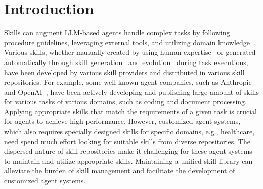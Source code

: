 \documentclass{article}
\theoremstyle{plain}
\theoremstyle{definition}
\theoremstyle{remark}
\begin{document}
\printAffiliationsAndNotice{}  %

\begin{abstract}
  This document provides a basic paper template and submission guidelines.
  Abstracts must be a single paragraph, ideally between 4--6 sentences long.
  Gross violations will trigger corrections at the camera-ready phase.
\end{abstract}

\section{Introduction}
Skills can augment LLM-based agents handle complex tasks by following procedure guidelines,
leveraging external tools, and utilizing domain knowledge~\cite{xxx}. 
Various skills, whether manually created by using human expertise~\cite{xxx} or generated automatically through skill generation~\cite{xxx} and evolution~\cite{xxx} during task executions, have been developed by various skill providers and distributed in various skill repositories. 
For example, some well-known agent companies, such as Anthropic~\cite{xxx} and OpenAI~\cite{xxx}, have been actively developing and publishing large amount of skills for various tasks of various domains,
such as coding and document processing. 
Applying appropriate skills that match the requirements of a given task is crucial for agents to achieve high performance.
However, customized agent systems, which also requires specially designed skills for specific domains, e.g., healthcare, need spend much effort looking for suitable skills from diverse repositories.
The dispersed nature of skill repositories make it challenging for these agent systems to maintain and utilize appropriate skills.
Maintaining a unified skill library can alleviate the burden of skill management and facilitate the development of customized agent systems.
\end{document}
